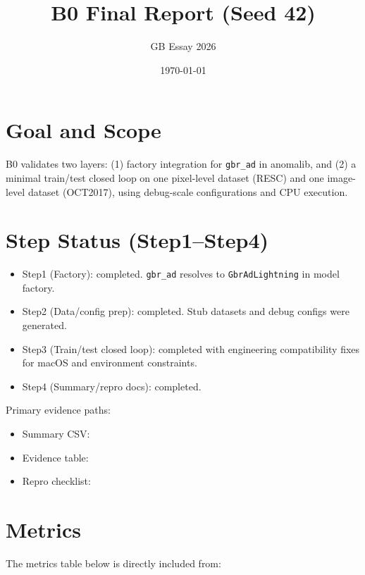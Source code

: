 \documentclass[11pt]{article}
\title{B0 Final Report (Seed 42)}
\author{GB Essay 2026}
\date{\today}
\begin{document}
\maketitle

\section{Goal and Scope}
B0 validates two layers: (1) factory integration for \texttt{gbr\_ad} in anomalib, and (2) a minimal train/test closed loop on one pixel-level dataset (RESC) and one image-level dataset (OCT2017), using debug-scale configurations and CPU execution.

\section{Step Status (Step1--Step4)}
\begin{itemize}
\item Step1 (Factory): completed. \texttt{gbr\_ad} resolves to \texttt{GbrAdLightning} in model factory.
\item Step2 (Data/config prep): completed. Stub datasets and debug configs were generated.
\item Step3 (Train/test closed loop): completed with engineering compatibility fixes for macOS and environment constraints.
\item Step4 (Summary/repro docs): completed.
\end{itemize}

Primary evidence paths:
\begin{itemize}
\item Summary CSV: 
\item Evidence table: 
\item Repro checklist: 
\end{itemize}

\section{Metrics}
The metrics table below is directly included from:
\end{document}
